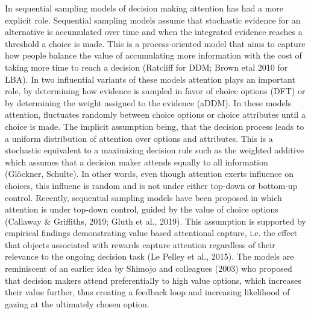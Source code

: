 \documentclass{article}
\begin{document}
In sequential sampling models of decision making attention has had a more explicit role. Sequential sampling models assume that stochastic evidence for an alternative is accumulated over time and when the integrated evidence reaches a threshold a choice is made. This is a process-oriented model that aims to capture how people balance the value of accumulating more information with the cost of taking more time to reach a decision (Ratcliff for DDM; Brown etal 2010 for LBA). In two influential variants of these models attention plays an important role, by determining how evidence is sampled in favor of choice options (DFT) or by determining the weight assigned to the evidence (aDDM). In these models attention, fluctuates randomly between choice options or choice attributes until a choice is made. The implicit assumption being, that the decision process leads to a uniform distribution of attention over options and attributes. This is a stochastic equivalent to a maximizing decision rule such as the weighted additive which assumes that a decision maker attends equally to all information (Glöckner, Schulte). In other words, even though attention exerts influence on choices, this influene is random and is not under either top-down or bottom-up control. Recently, sequential sampling models have been proposed in which attention is under top-down control, guided by the value of choice options (Callaway & Griffiths, 2019; Gluth et al., 2019). This assumption is supported by empirical findings demonstrating value based attentional capture, i.e. the effect that objects associated with rewards capture attention regardless of their relevance to the ongoing decision task (Le Pelley et al., 2015). The models are reminiscent of an earlier idea by Shimojo and colleagues (2003) who proposed that decision makers attend preferentially to high value options, which increases their value further, thus creating a feedback loop and increasing likelihood of gazing at the ultimately chosen option. 
\end{document}
